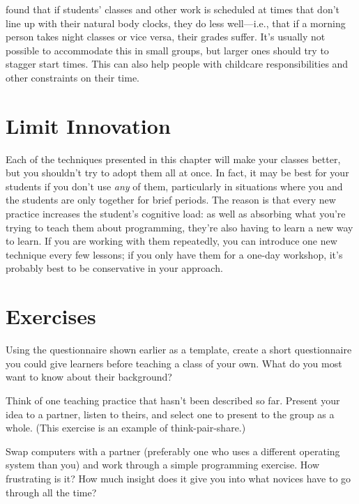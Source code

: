 \cite{Smar2018} found that if students' classes and other work is
scheduled at times that don't line up with their natural body clocks,
they do less well---i.e., that if a morning person takes night classes
or vice versa, their grades suffer.  It's usually not possible to
accommodate this in small groups, but larger ones should try to
stagger start times.  This can also help people with childcare
responsibilities and other constraints on their time.

\section{Limit Innovation}\label{s:classroom-innovate}

Each of the techniques presented in this chapter will make your
classes better, but you shouldn't try to adopt them all at once.  In
fact, it may be best for your students if you don't use \emph{any} of
them, particularly in situations where you and the students are only
together for brief periods.  The reason is that every new practice
increases the student's cognitive load: as well as absorbing what
you're trying to teach them about programming, they're also having to
learn a new way to learn.  If you are working with them repeatedly,
you can introduce one new technique every few lessons; if you only
have them for a one-day workshop, it's probably best to be
conservative in your approach.

\section{Exercises}\label{s:classroom-exercises}


Using the questionnaire shown earlier as a template, create a short
questionnaire you could give learners before teaching a class of your
own. What do you most want to know about their background?


Think of one teaching practice that hasn't been described so far.
Present your idea to a partner, listen to theirs, and select one to
present to the group as a whole.  (This exercise is an example of
think-pair-share.)


Swap computers with a partner (preferably one who uses a different
operating system than you) and work through a simple programming
exercise.  How frustrating is it?  How much insight does it give you
into what novices have to go through all the time?

